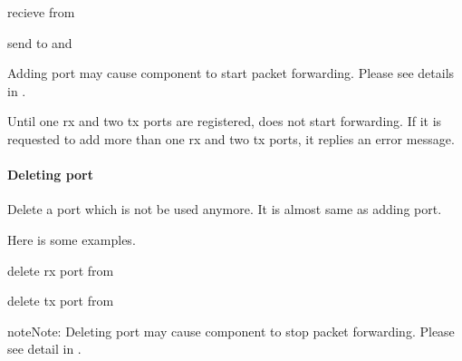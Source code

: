 \documentclass[a4paper,11pt,openany,oneside,english]{sphinxmanual}
\begin{document}
\begin{sphinxVerbatim}[commandchars=\\\{\},formatcom=\footnotesize]
 recieve from 

 send to  and 
\end{sphinxVerbatim}

Adding port may cause component to start packet forwarding. Please see
details in
{\hyperref[\detokenize{design/spp_secondary:spp-design-spp-sec-mirror}]{}}.

Until one rx and two tx ports are registered,  does not start
forwarding. If it is requested to add more than one rx and two tx ports, it
replies an error message.


\paragraph{Deleting port}
\label{\detokenize{commands/secondary/spp_mirror:deleting-port}}
Delete a port which is not be used anymore. It is almost same as adding port.

\begin{sphinxVerbatim}[commandchars=\\\{\},formatcom=\footnotesize]
\end{sphinxVerbatim}

Here is some examples.

\begin{sphinxVerbatim}[commandchars=\\\{\},formatcom=\footnotesize]
 delete rx port  from 

 delete tx port  from 
\end{sphinxVerbatim}

\begin{sphinxadmonition}{note}{Note:}
Deleting port may cause component to stop packet forwarding.
Please see detail in {\hyperref[\detokenize{design/spp_secondary:spp-design-spp-sec-mirror}]{}}.
\end{sphinxadmonition}
\end{document}
